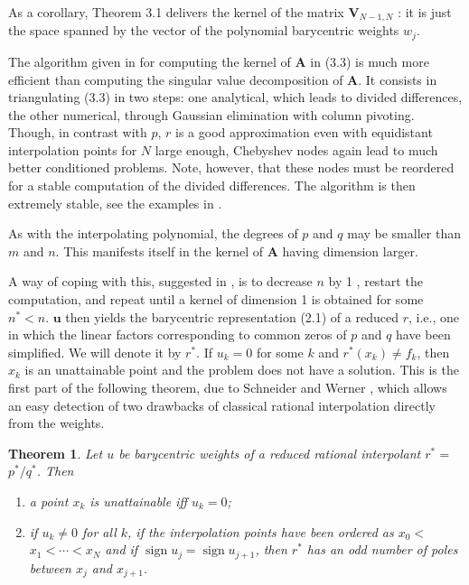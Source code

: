\documentclass[11pt]{article}
\newtheorem{theorem}{Theorem}[section]
\theoremstyle{definition}
\begin{document}
As a corollary, Theorem 3.1 delivers the kernel of the matrix $\mathbf{V}_{N-1, N}$ : it is just the space spanned by the vector of the polynomial barycentric weights $w_{j}$.


The algorithm given in \cite{berrut1997matrices} for computing the kernel of $\mathbf{A}$ in (3.3) is much more efficient than computing the singular value decomposition of $\mathbf{A}$. It consists in triangulating (3.3) in two steps: one analytical, which leads to divided differences, the other numerical, through Gaussian elimination with column pivoting. Though, in contrast with $p$, $r$ is a good approximation even with equidistant interpolation points for $N$ large enough, Chebyshev nodes again lead to much better conditioned problems. Note, however, that these nodes must be reordered for a stable computation of the divided differences. The algorithm is then extremely stable, see the examples in \cite{berrut1997matrices}.

As with the interpolating polynomial, the degrees of $p$ and $q$ may be smaller than $m$ and $n$. This manifests itself in the kernel of $\mathbf{A}$ having dimension larger.


A way of coping with this, suggested in \cite{berrut1997matrices}, is to decrease $n$ by 1 , restart the computation, and repeat until a kernel of dimension 1 is obtained for some $n^{*}<n$. $\mathbf{u}$ then yields the barycentric representation (2.1) of a reduced $r$, i.e., one in which the linear factors corresponding to common zeros of $p$ and $q$ have been simplified. We will denote it by $r^{*}$. If $u_{k}=0$ for some $k$ and $r^{*}\left(x_{k}\right) \neq f_{k}$, then $x_{k}$ is an unattainable point and the problem does not have a solution. This is the first part of the following theorem, due to Schneider and Werner \cite{berrut1997matrices}, which allows an easy detection of two drawbacks of classical rational interpolation directly from the weights.

\begin{theorem}
    Let $u$ be barycentric weights of a reduced rational interpolant $r^{*}=$ $p^{*} / q^{*}$. Then
    \begin{enumerate}
        \item[a)] a point $x_{k}$ is unattainable iff $u_{k}=0$;
        \item[b)] if $u_{k} \neq 0$ for all $k$, if the interpolation points have been ordered as $x_{0}<$ $x_{1}<\cdots<x_{N}$ and if $\operatorname{sign} u_{j}=\operatorname{sign} u_{j+1}$, then $r^{*}$ has an odd number of poles between $x_{j}$ and $x_{j+1}$.
    \end{enumerate}
\end{theorem}
\end{document}

